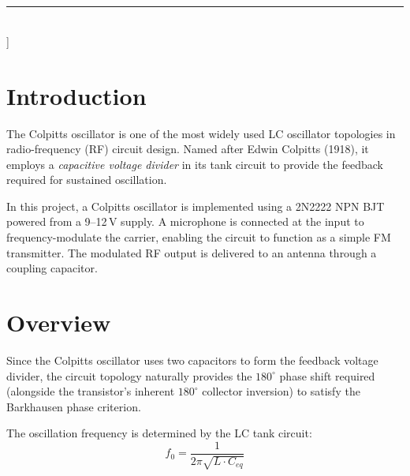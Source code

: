 \documentclass[10pt, twocolumn]{article}
\begin{document}
\twocolumn[%
  \centering
  {\Large\bfseries FM Colpitts Oscillator Transmitter\\[4pt]
   Design, Implementation, and Analysis}\\[6pt]
  {\normalsize
    Sai Krishna Bakki \quad -- \quad EE25BTECH11049\\
    Adharvan K.B  \quad -- \quad EE25BTECH11003
  }\\[8pt]
  \begin{minipage}{\linewidth}
    \tableofcontents
  \end{minipage}\\[6pt]
  \rule{\linewidth}{0.4pt}\\[4pt]
]

\section{Introduction}

The Colpitts oscillator is one of the most widely used LC oscillator topologies
in radio-frequency (RF) circuit design. Named after Edwin Colpitts (1918), it
employs a \textit{capacitive voltage divider} in its tank circuit to provide
the feedback required for sustained oscillation.

In this project, a Colpitts oscillator is implemented using a 2N2222 NPN BJT
powered from a 9--12\,V supply. A microphone is connected at the input to
frequency-modulate the carrier, enabling the circuit to function as a simple
FM transmitter. The modulated RF output is delivered to an antenna through
a coupling capacitor.

\section{Overview}

Since the Colpitts oscillator uses two capacitors to form the feedback
voltage divider, the circuit topology naturally provides the $180^{\circ}$
phase shift required (alongside the transistor's inherent $180^{\circ}$
collector inversion) to satisfy the Barkhausen phase criterion.

The oscillation frequency is determined by the LC tank circuit:
\begin{equation}
  f_0 = \frac{1}{2\pi\sqrt{L \cdot C_{eq}}}
  \label{eq:freq}
\end{equation}
\end{document}
